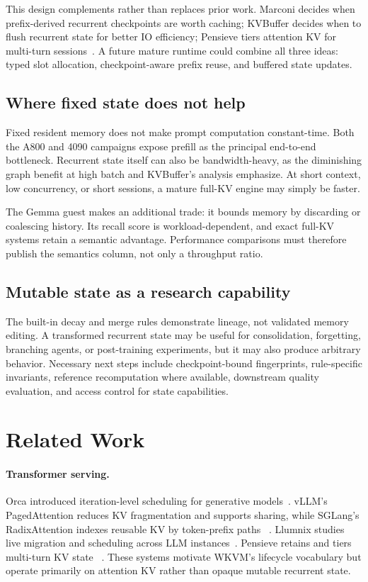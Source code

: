 \documentclass[10pt,letterpaper]{article}
\newcommand{\wkvm}{\textsc{WKVM}}
\begin{document}
This design complements rather than replaces prior work.  Marconi decides when
prefix-derived recurrent checkpoints are worth caching; KVBuffer decides when
to flush recurrent state for better IO efficiency; Pensieve tiers attention KV
for multi-turn sessions~\cite{marconi,kvbuffer,pensieve}.  A future mature
runtime could combine all three ideas: typed slot allocation, checkpoint-aware
prefix reuse, and buffered state updates.

\subsection{Where fixed state does not help}

Fixed resident memory does not make prompt computation constant-time.  Both
the A800 and 4090 campaigns expose prefill as the principal end-to-end
bottleneck.  Recurrent state itself can also be bandwidth-heavy, as the
diminishing graph benefit at high batch and KVBuffer's analysis emphasize.
At short context, low concurrency, or short sessions, a mature full-KV engine
may simply be faster.

The Gemma guest makes an additional trade: it bounds memory by discarding or
coalescing history.  Its recall score is workload-dependent, and exact full-KV
systems retain a semantic advantage.  Performance comparisons must therefore
publish the semantics column, not only a throughput ratio.

\subsection{Mutable state as a research capability}

The built-in decay and merge rules demonstrate lineage, not validated memory
editing.  A transformed recurrent state may be useful for consolidation,
forgetting, branching agents, or post-training experiments, but it may also
produce arbitrary behavior.  Necessary next steps include checkpoint-bound
fingerprints, rule-specific invariants, reference recomputation where
available, downstream quality evaluation, and access control for state
capabilities.

\section{Related Work}

\paragraph{Transformer serving.}
Orca introduced iteration-level scheduling for generative models~\cite{orca}.
vLLM's PagedAttention reduces KV fragmentation and supports sharing, while
SGLang's RadixAttention indexes reusable KV by token-prefix paths
~\cite{vllm,sglang}.  Llumnix studies live migration and scheduling across LLM
instances~\cite{llumnix}.  Pensieve retains and tiers multi-turn KV state
~\cite{pensieve}.  These systems motivate \wkvm's lifecycle vocabulary but
operate primarily on attention KV rather than opaque mutable recurrent state.
\end{document}
